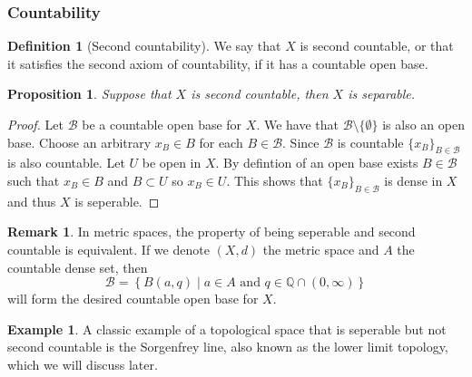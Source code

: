 \documentclass[11pt,a4paper]{article}
\theoremstyle{definition}
\newtheorem{definition}{Definition}[section]
\newtheorem{remark}{Remark}[section]
\newtheorem{example}{Example}[section]
\theoremstyle{plain}
\newtheorem{proposition}[theorem]{Proposition}
\newcommand{\Q}{\mathbb{Q}}
\newcommand{\set}[2]{ \left\{ #1 \mid #2 \right\} }
\begin{document}
  \subsubsection{Countability}

  \begin{definition}[Second countability]
    We say that $X$ is second countable, or that it satisfies the second
    axiom of countability, if it has a countable open base.
  \end{definition}

  \begin{proposition}
    Suppose that $X$ is second countable, then $X$ is separable.
  \end{proposition}

  \begin{proof}
    Let $\mathcal{B}$ be a countable open base for $X$. We have that 
    $\mathcal{B} \setminus \{\emptyset\}$ is also an open base. Choose
    an arbitrary $x_B \in B$ for each $B \in \mathcal{B}$. Since 
    $\mathcal{B}$ is countable $\{x_B\}_{B \in \mathcal{B}}$ is also 
    countable. Let $U$ be open in $X$. By defintion of an open base exists 
    $B \in \mathcal{B}$ such that $x_B \in B$ and $B \subset U$ so 
    $x_B \in U$. This shows that $\{x_B\}_{B \in \mathcal{B}}$ is dense
    in $X$ and thus $X$ is seperable.
  \end{proof}

  \begin{remark}
    In metric spaces, the property of being seperable and second countable
    is equivalent. If we denote $(X,d)$ the metric space and $A$ the 
    countable dense set, then
    \[
      \mathcal{B} = \set{B(a,q)}{a \in A \text{ and } q \in \Q \cap 
      (0,\infty)}
    \]
    will form the desired countable open base for $X$.
  \end{remark}

  \begin{example}
    A classic example of a topological space that is seperable but not
    second countable is the Sorgenfrey line, also known as the lower
    limit topology, which we will discuss later.
  \end{example}
\end{document}
